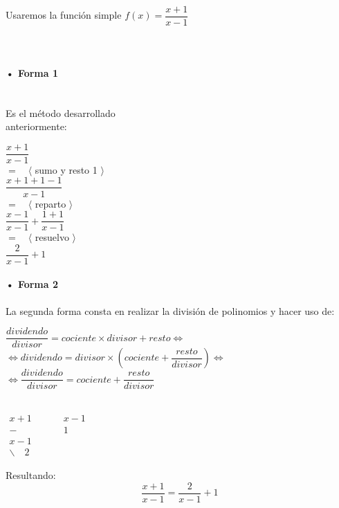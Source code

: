 Usaremos la función simple $f(x)=\dfrac{x+1}{x-1}$\\
\hfill
\quad \\
\quad \\
\begin{minipage}{.30\textwidth}

\paragraph{• Forma 1}
\quad \\
Es el método desarrollado \\
anteriormente:
\\
\begin{center}
$ \dfrac{x+1}{x-1}$\\
$= \quad \langle$ sumo y resto 1  $\rangle$\\
$ \dfrac{x+1+1-1}{x-1}$\\
$= \quad \langle$ reparto  $\rangle$\\
$ \dfrac{x-1}{x-1}+\dfrac{1+1}{x-1}$\\
$= \quad \langle$ resuelvo  $\rangle$\\
$ \dfrac{2}{x-1}+1$\\
\end{center}
\end{minipage}
\hfill
\begin{minipage}{.55\textwidth}
\paragraph{• Forma 2}
La segunda forma consta en realizar la división de polinomios y hacer uso de:\\
\begin{center}
$\dfrac{dividendo}{divisor}=cociente \times divisor +resto \Leftrightarrow $\\
$ \Leftrightarrow  dividendo= divisor \times \left(cociente+\dfrac{resto}{divisor}\right) \Leftrightarrow $\\
$\Leftrightarrow \dfrac{dividendo}{divisor}=cociente+\dfrac{resto}{divisor}$\\
\quad \\

\end{center}

\hfill
\begin{minipage}{.45\textwidth}
$
\begin{array}{c|c}
 x + 1 & x - 1 \\
\hline 
- \qquad \qquad & 1 \qquad \\
 x-1 &\\
\hline 
 \smallsetminus \quad 2 &
\end{array}$\\
\end{minipage}
\hfill
\begin{minipage}{.45\textwidth}
\begin{center}

Resultando:
$$\dfrac{x+1}{x-1} = \dfrac{2}{x-1}+1$$
\end{center}
\end{minipage}
\hfill
\\
\end{minipage}
